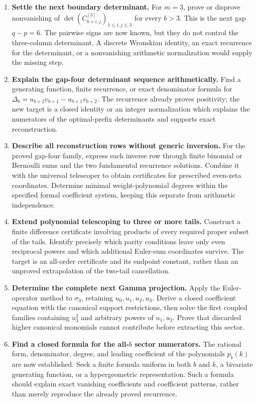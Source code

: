\documentclass[11pt,letterpaper]{article}
\numberwithin{equation}{section}
\theoremstyle{plain}
\theoremstyle{definition}
\theoremstyle{remark}
\begin{document}
\begin{enumerate}
\item \textbf{Settle the next boundary determinant.}
For $m=3$, prove or disprove nonvanishing of
$\det(C_{b+i,j}^{[3]})_{1\le i,j\le3}$ for every $b>3$.
This is the next gap $q-p=6$. The pairwise signs are now known, but
they do not control the three-column determinant. A discrete Wronskian
identity, an exact recurrence for the determinant, or a nonvanishing
arithmetic normalization would supply the missing step.

\item \textbf{Explain the gap-four determinant sequence arithmetically.}
Find a generating function, finite recurrence, or exact denominator
formula for $\Delta_b=u_{b+2}v_{b+1}-u_{b+1}v_{b+2}$.
The recurrence already proves positivity; the new target is a closed
identity or an integer normalization which explains the numerators
of the optimal-prefix determinants and supports exact reconstruction.

\item \textbf{Describe all reconstruction rows without generic inversion.}
For the proved gap-four family, express each inverse row through
finite binomial or Bernoulli sums and the two fundamental recurrence
solutions. Combine it with the universal telescoper to obtain
certificates for prescribed even-zeta coordinates. Determine minimal
weight-polynomial degrees within the specified formal coefficient
system, keeping this separate from arithmetic independence.

\item \textbf{Extend polynomial telescoping to three or more tails.}
Construct a finite difference certificate involving products of every
required proper subset of the tails. Identify precisely which parity
conditions leave only even reciprocal powers and which additional
Euler-sum coordinates survive. The target is an all-order certificate
and its endpoint constant, rather than an unproved extrapolation of
the two-tail cancellation.

\item \textbf{Determine the complete next Gamma projection.}
Apply the Euler-operator method to $\sigma_3$, retaining
$u_0,u_1,u_2,u_3$. Derive a closed coefficient equation with the
canonical support restrictions, then solve the first coupled families
containing $u_3^2$ and arbitrary powers of $u_1,u_2$.
Prove that discarded higher canonical monomials cannot contribute
before extracting this sector.

\item \textbf{Find a closed formula for the all-$b$ sector numerators.}
The rational form, denominator, degree, and leading coefficient of
the polynomials $p_b(k)$ are now established. Seek a finite formula
uniform in both $b$ and $k$, a bivariate generating function, or a
hypergeometric representation. Such a formula should explain exact
vanishing coefficients and coefficient patterns, rather than merely
reproduce the already proved recurrence.


\end{enumerate}
\end{document}
